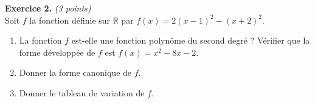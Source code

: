 \documentclass[11pt]{article}
\begin{document}
\noindent\textbf{Exercice 2.} \hspace{.5cm}\emph{(3 points)}\\
Soit $f$ la fonction définie sur $\mathbb{R}$ par $f(x)=2(x-1)^2-(x+2)^2$.
\begin{enumerate}
  \item La fonction $f$ est-elle une fonction polynôme du second degré ?
    Vérifier que la forme développée de $f$ est $f(x) = x^2-8x-2$.
  \item Donner la forme canonique de $f$.
  \item Donner le tableau de variation de $f$.
\end{enumerate}
\end{document}
